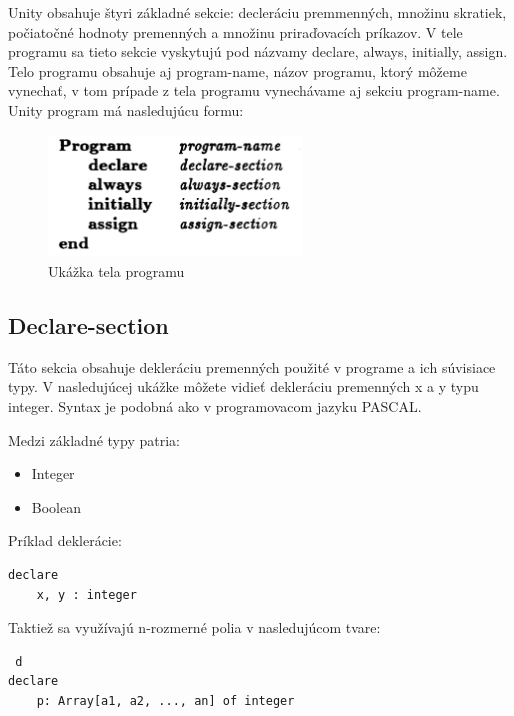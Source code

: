 Unity obsahuje štyri základné sekcie: decleráciu premmenných, množinu skratiek, počiatočné hodnoty premenných a množinu priraďovacích príkazov. V tele programu sa tieto sekcie vyskytujú pod názvamy declare, always, initially, assign. Telo programu obsahuje aj program-name, názov programu, ktorý môžeme vynechať, v tom prípade z tela programu vynechávame aj sekciu program-name. Unity program má nasledujúcu formu:

\begin{figure}[h]
\centerline{\includegraphics[width=0.6\textwidth]{images/screen1}}
\caption[Ukážka tela programu]{Ukážka tela programu}
\label{obr:programbody}
\end{figure}

\subsection{Declare-section}

Táto sekcia obsahuje dekleráciu premenných použité v programe a ich súvisiace typy. V nasledujúcej ukážke môžete vidieť dekleráciu premenných x a y typu integer. Syntax je podobná ako v programovacom jazyku PASCAL. 

\vspace{5mm}

Medzi základné typy patria:
\begin{itemize}
\item Integer
\item Boolean
\end{itemize}

\vspace{5mm}

Príklad deklerácie:
\begin{lstlisting}
declare 
	x, y : integer
\end{lstlisting}

\vspace{5mm}

Taktiež sa využívajú n-rozmerné polia v nasledujúcom tvare:
\begin{lstlisting} d
declare 
	p: Array[a1, a2, ..., an] of integer
\end{lstlisting}

